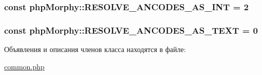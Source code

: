 \label{classphpMorphy_a9cfb01a8a056c9322e3bb3680a8b921c}
\hypertarget{classphpMorphy_a7619b0422b061a198516617ab96673f2}{
\subsubsection[{RESOLVE\_\-ANCODES\_\-AS\_\-INT}]{\setlength{\rightskip}{0pt plus 5cm}const {\bf phpMorphy::RESOLVE\_\-ANCODES\_\-AS\_\-INT} = 2}}
\label{classphpMorphy_a7619b0422b061a198516617ab96673f2}
\hypertarget{classphpMorphy_a919a599c76ec4bb2a5f284d9a1b0da2e}{
\subsubsection[{RESOLVE\_\-ANCODES\_\-AS\_\-TEXT}]{\setlength{\rightskip}{0pt plus 5cm}const {\bf phpMorphy::RESOLVE\_\-ANCODES\_\-AS\_\-TEXT} = 0}}
\label{classphpMorphy_a919a599c76ec4bb2a5f284d9a1b0da2e}


Объявления и описания членов класса находятся в файле:\begin{DoxyCompactItemize}
\item 
\hyperlink{common_8php}{common.php}\end{DoxyCompactItemize}
